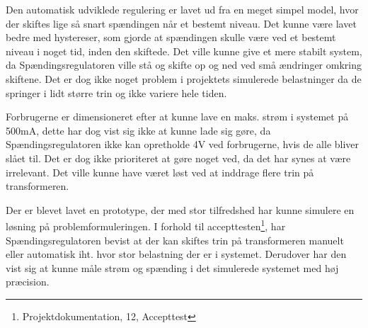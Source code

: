 
Den automatisk udviklede regulering er lavet ud fra en meget simpel model, hvor der skiftes lige så snart spændingen når et bestemt niveau. Det kunne være lavet bedre med hystereser, som gjorde at spændingen skulle være ved et bestemt niveau i noget tid, inden den skiftede. Det ville kunne give et mere stabilt system, da Spændingsregulatoren ville stå og skifte op og ned ved små ændringer omkring skiftene. Det er dog ikke noget problem i projektets simulerede belastninger da de springer i lidt større trin og ikke variere hele tiden.

Forbrugerne er dimensioneret efter at kunne lave en maks. strøm i systemet på 500mA, dette har dog vist sig ikke at kunne lade sig gøre, da Spændingsregulatoren ikke kan opretholde 4V ved forbrugerne, hvis de alle bliver slået til. Det er dog ikke prioriteret at gøre noget ved, da det har synes at være irrelevant. Det ville kunne have været løst ved at inddrage flere trin på transformeren.

Der er blevet lavet en prototype, der med stor tilfredshed har kunne simulere en løsning på problemformuleringen. I forhold til accepttesten\footnote{Projektdokumentation, 12, Accepttest}, har Spændingsregulatoren bevist at der kan skiftes trin på transformeren manuelt eller automatisk iht. hvor stor belastning der er i systemet. Derudover har den vist sig at kunne måle strøm og spænding i det simulerede systemet med høj præcision.
